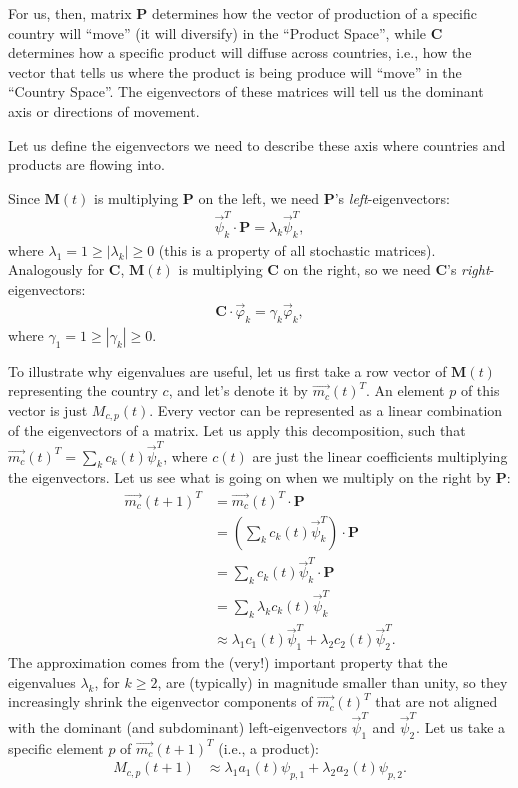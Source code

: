 \documentclass[12pt]{article}
\newcommand{\mtx}[1]{\mathbf{ #1}}
\begin{document}
For us, then, matrix $\mtx{P}$ determines how the vector of production of a specific country will ``move'' (it will diversify) in the ``Product Space'', while $\mtx{C}$ determines how a specific product will diffuse across countries, i.e., how the vector that tells us where the product is being produce will ``move'' in the ``Country Space''. The eigenvectors of these matrices will tell us the dominant axis or directions of movement.

Let us define the eigenvectors we need to describe these axis where countries and products are flowing into. 

Since $\mtx{M}(t)$ is multiplying $\mtx{P}$ on the left, we need $\mtx{P}$'s \emph{left}-eigenvectors:
\begin{align}
	\vec{\psi}_k^T \cdot\mtx{P} = \lambda_k \vec{\psi}_k^T,
\end{align}
where $\lambda_1 = 1 \geq \left|\lambda_k\right| \geq 0$ (this is a property of all stochastic matrices). Analogously for $\mtx{C}$, $\mtx{M}(t)$ is multiplying $\mtx{C}$ on the right, so we need $\mtx{C}$'s \emph{right}-eigenvectors:
\begin{align}
	\mtx{C}\cdot \vec{\varphi}_k = \gamma_k \vec{\varphi}_k,
\end{align}
where $\gamma_1 = 1 \geq \left|\gamma_k\right| \geq 0$.

To illustrate why eigenvalues are useful, let us first take a row vector of $\mtx{M}(t)$ representing the country $c$, and let's denote it by $\vec{m_c}(t)^T$. An element $p$ of this vector is just $M_{c,p}(t)$. Every vector can be represented as a linear combination of the eigenvectors of a matrix. Let us apply this decomposition, such that $\vec{m_c}(t)^T=\sum_k c_k(t) \vec{\psi}_k^T$, where $c(t)$ are just the linear coefficients multiplying the eigenvectors. Let us see what is going on when we multiply on the right by $\mtx{P}$:
\begin{align*}
	\vec{m_c}(t+1)^T &= \vec{m_c}(t)^T\cdot\mtx{P} \\
	&= \left(\sum_k c_k(t) \vec{\psi}_k^T \right)\cdot\mtx{P} \\
	&= \sum_k c_k(t) \vec{\psi}_k^T \cdot\mtx{P} \\
	&= \sum_k \lambda_k c_k(t) \vec{\psi}_k^T  \\
	&\approx \lambda_1 c_1(t) \vec{\psi}_1^T + \lambda_2 c_2(t) \vec{\psi}_2^T.
\end{align*}
The approximation comes from the (very!) important property that the eigenvalues $\lambda_k$, for $k\geq 2$, are (typically) in magnitude smaller than unity, so they increasingly shrink the eigenvector components of $\vec{m_c}(t)^T$ that are not aligned with the dominant (and subdominant) left-eigenvectors $\vec{\psi}_1^T$ and $\vec{\psi}_2^T$. Let us take a specific element $p$ of $\vec{m_c}(t+1)^T$ (i.e., a product):
\begin{align*}
	M_{c,p}(t+1) &\approx \lambda_1 a_1(t) \psi_{p,1} + \lambda_2 a_2(t) \psi_{p,2}.
\end{align*}
\end{document}
